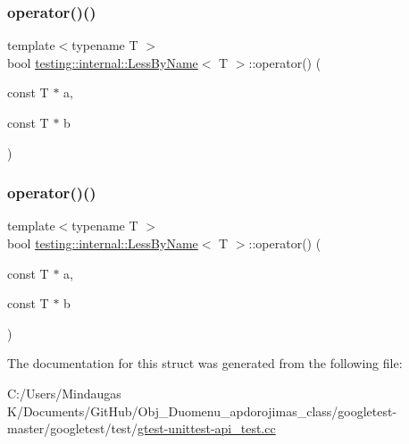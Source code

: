 \mbox{\label{structtesting_1_1internal_1_1_less_by_name_a62386ac7750bfc035536be55d90a52eb}} 
\subsubsection{\texorpdfstring{operator()()}{operator()()}\hspace{0.1cm}{\footnotesize\ttfamily [2/3]}}
{\footnotesize\ttfamily template$<$typename T $>$ \\
bool \mbox{\hyperlink{structtesting_1_1internal_1_1_less_by_name}{testing\+::internal\+::\+Less\+By\+Name}}$<$ T $>$\+::operator() (\begin{DoxyParamCaption}\item[{const T $\ast$}]{a,  }\item[{const T $\ast$}]{b }\end{DoxyParamCaption})\hspace{0.3cm}{\ttfamily [inline]}}

\mbox{\label{structtesting_1_1internal_1_1_less_by_name_a62386ac7750bfc035536be55d90a52eb}} 
\subsubsection{\texorpdfstring{operator()()}{operator()()}\hspace{0.1cm}{\footnotesize\ttfamily [3/3]}}
{\footnotesize\ttfamily template$<$typename T $>$ \\
bool \mbox{\hyperlink{structtesting_1_1internal_1_1_less_by_name}{testing\+::internal\+::\+Less\+By\+Name}}$<$ T $>$\+::operator() (\begin{DoxyParamCaption}\item[{const T $\ast$}]{a,  }\item[{const T $\ast$}]{b }\end{DoxyParamCaption})\hspace{0.3cm}{\ttfamily [inline]}}



The documentation for this struct was generated from the following file\+:\begin{DoxyCompactItemize}
\item 
C\+:/\+Users/\+Mindaugas K/\+Documents/\+Git\+Hub/\+Obj\+\_\+\+Duomenu\+\_\+apdorojimas\+\_\+class/googletest-\/master/googletest/test/\mbox{\hyperlink{googletest-master_2googletest_2test_2gtest-unittest-api__test_8cc}{gtest-\/unittest-\/api\+\_\+test.\+cc}}\end{DoxyCompactItemize}
